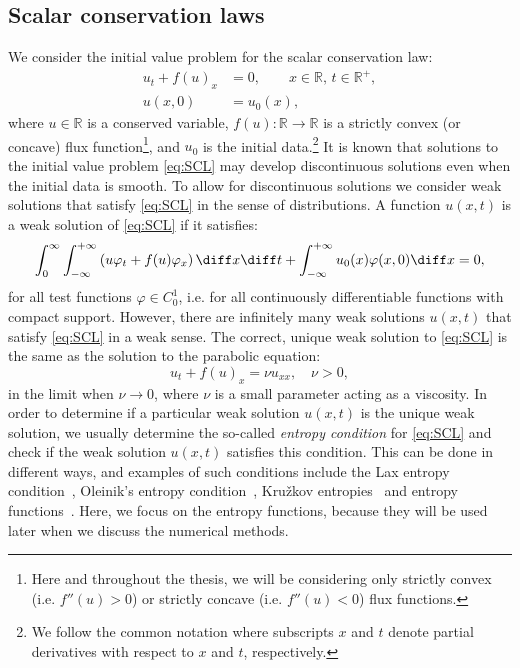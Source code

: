 \subsection{Scalar conservation laws}
\label{sec:SCL}

We consider the initial value problem for the scalar conservation law:
\begin{subequations} \label{eq:SCL}
\begin{align}
u_t + f(u)_x & = 0, \qquad x \in \mathbb{R}, \, t \in \mathbb{R}^+, \label{eq:SCL-a} \\
u(x,0) & = u_0(x), 
\end{align}
\end{subequations}
where $ u \in \mathbb{R} $ is a conserved variable, $ f(u): \mathbb{R} \rightarrow \mathbb{R} $ is a strictly convex (or concave) flux function\footnote{Here and throughout the thesis, we will be considering only strictly convex (i.e. \mbox{$ f''(u) > 0 $}) or strictly concave (i.e. $ f''(u) < 0 $) flux functions.}, and $ u_0 $ is the initial data.\footnote{We follow the common notation where subscripts $ x $ and $ t $ denote partial derivatives with respect to $ x $ and $ t $, respectively.} It is known that solutions to the initial value problem \eqref{eq:SCL} may develop discontinuous solutions even when the initial data is smooth. To allow for discontinuous solutions we consider weak solutions that satisfy \eqref{eq:SCL} in the sense of distributions. A function $ u(x,t) $ is a weak solution of \eqref{eq:SCL} if it satisfies:
\begin{equation} \label{eq:weak-form}
\int_{0}^{\infty} \int_{-\infty}^{+\infty} \left( u \varphi_t + f(u) \varphi_x \right) \diff x \diff t + \int_{-\infty}^{+\infty} u_0(x) \varphi(x,0) \diff x = 0,
\end{equation}
for all test functions $ \varphi \in C_0^1 $, i.e. for all continuously differentiable functions with compact support. However, there are infinitely many weak solutions $ u(x,t) $ that satisfy \eqref{eq:SCL} in a weak sense. The correct, unique weak solution to \eqref{eq:SCL} is the same as the solution to the parabolic equation:
\begin{equation} \label{eq:SCL-viscous}
u_t + f(u)_x = \nu u_{xx}, \quad \nu > 0,
\end{equation}
in the limit when $ \nu \rightarrow 0 $, where $ \nu $ is a small parameter acting as a viscosity. In order to determine if a particular weak solution $ u(x,t) $ is the unique weak solution, we usually determine the so-called \textit{entropy condition} for \eqref{eq:SCL} and check if the weak solution $ u(x,t) $ satisfies this condition. This can be done in different ways, and examples of such conditions include the Lax entropy condition~\cite{lax72}, Oleinik's entropy condition~\cite{ole57}, Kru\v{z}kov entropies~\cite{kru70} and entropy functions~\cite{lax72}. Here, we focus on the entropy functions, because they will be used later when we discuss the numerical methods.

